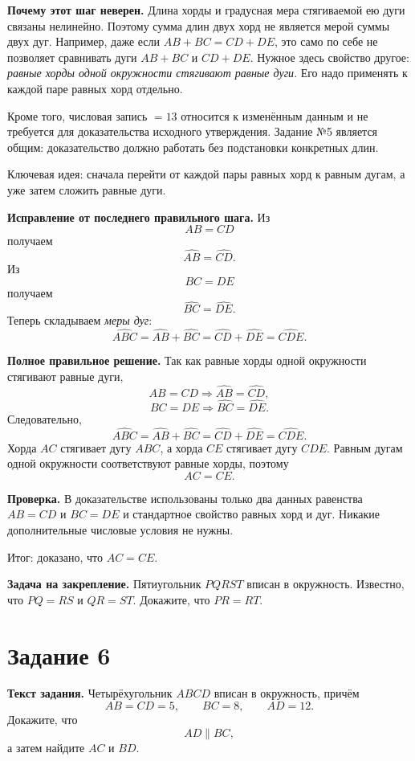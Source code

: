 \documentclass[12pt,a4paper]{article}
\newcommand{\keyidea}[1]{\textcolor{blue!60!black}{Ключевая идея:} #1}
\newcommand{\resultlabel}[1]{\textcolor{teal!60!black}{Итог:} #1}
\begin{document}
\textbf{Почему этот шаг неверен.} Длина хорды и градусная мера стягиваемой ею дуги связаны нелинейно. Поэтому сумма длин двух хорд не является мерой суммы двух дуг. Например, даже если $AB+BC=CD+DE$, это само по себе не позволяет сравнивать дуги $AB+BC$ и $CD+DE$. Нужное здесь свойство другое: \emph{равные хорды одной окружности стягивают равные дуги}. Его надо применять к каждой паре равных хорд отдельно.

Кроме того, числовая запись $=13$ относится к изменённым данным и не требуется для доказательства исходного утверждения. Задание №5 является общим: доказательство должно работать без подстановки конкретных длин.

\keyidea{сначала перейти от каждой пары равных хорд к равным дугам, а уже затем сложить равные дуги.}

\textbf{Исправление от последнего правильного шага.} Из
\[
AB=CD
\]
получаем
\[
\widehat{AB}=\widehat{CD}.
\]
Из
\[
BC=DE
\]
получаем
\[
\widehat{BC}=\widehat{DE}.
\]
Теперь складываем \emph{меры дуг}:
\[
\widehat{ABC}=\widehat{AB}+\widehat{BC}
=\widehat{CD}+\widehat{DE}
=\widehat{CDE}.
\]

\textbf{Полное правильное решение.} Так как равные хорды одной окружности стягивают равные дуги,
\[
AB=CD\Rightarrow \widehat{AB}=\widehat{CD},
\]
\[
BC=DE\Rightarrow \widehat{BC}=\widehat{DE}.
\]
Следовательно,
\[
\widehat{ABC}=\widehat{AB}+\widehat{BC}
=\widehat{CD}+\widehat{DE}
=\widehat{CDE}.
\]
Хорда $AC$ стягивает дугу $ABC$, а хорда $CE$ стягивает дугу $CDE$. Равным дугам одной окружности соответствуют равные хорды, поэтому
\[
AC=CE.
\]

\textbf{Проверка.} В доказательстве использованы только два данных равенства $AB=CD$ и $BC=DE$ и стандартное свойство равных хорд и дуг. Никакие дополнительные числовые условия не нужны.

\resultlabel{доказано, что $AC=CE$.}

\textbf{Задача на закрепление.} Пятиугольник $PQRST$ вписан в окружность. Известно, что $PQ=RS$ и $QR=ST$. Докажите, что $PR=RT$.

\newpage
{}\label{task:6}
\section*{Задание 6}

\textbf{Текст задания.} Четырёхугольник $ABCD$ вписан в окружность, причём
\[
AB=CD=5,\qquad BC=8,\qquad AD=12.
\]
Докажите, что
\[
AD\parallel BC,
\]
а затем найдите $AC$ и $BD$.
\end{document}
